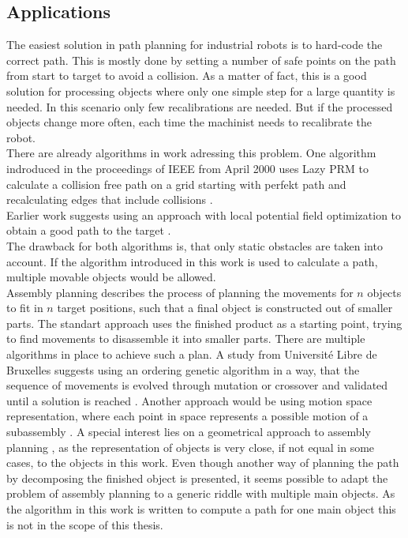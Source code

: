 \subsection{Applications}
The easiest solution in path planning for industrial robots is to hard-code the correct path. This is mostly done by setting a number of safe points on the path from start to target to avoid a collision. As a matter of fact, this is a good solution for processing objects where only one simple step for a large quantity is needed. In this scenario only few recalibrations are needed. But if the processed objects change more often, each time the machinist needs to recalibrate the robot. \\
There are already algorithms in work adressing this problem. One algorithm indroduced in the proceedings of IEEE from April 2000 uses Lazy PRM to calculate a collision free path on a grid starting with perfekt path and recalculating edges that include collisions \cite{lazyPRM}.\\
Earlier work suggests using an approach with local potential field optimization to obtain a good path to the target \cite{potField}.\\
The drawback for both algorithms is, that only static obstacles are taken into account. If the algorithm introduced in this work is used to calculate a path, multiple movable objects would be allowed.\\
\newline
Assembly planning describes the process of planning the movements for $n$ objects to fit in $n$ target positions, such that a final object  is constructed out of smaller parts. The standart approach uses the finished product as a starting point, trying to find movements to disassemble it into smaller parts. There are multiple algorithms in place to achieve such a plan. A study from Université Libre de Bruxelles suggests using an ordering genetic algorithm in a way, that the sequence of movements is evolved through mutation or crossover and validated until a solution is reached \cite{genAssembly}. Another approach would be using motion space representation, where each point in space represents a possible motion of a subassembly \cite{motionAssembly}. A special interest lies on a geometrical approach to assembly planning \cite{geoAssembly}, as the representation of objects is very close, if not equal in some cases, to the objects in this work. Even though another way of planning the path by decomposing the finished object is presented, it seems possible to adapt the problem of assembly planning to a generic riddle with multiple main objects. As the algorithm in this work is written to compute a path for one main object this is not in the scope of this thesis.\\
